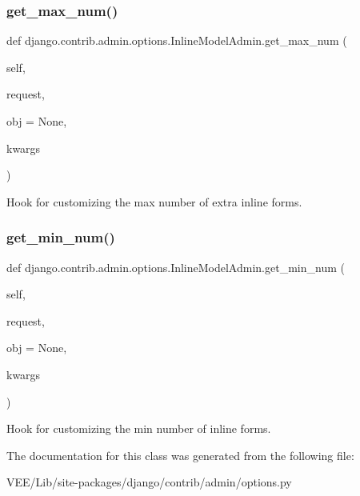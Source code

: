 \subsubsection{\texorpdfstring{get\+\_\+max\+\_\+num()}{get\_max\_num()}}
{\footnotesize\ttfamily def django.\+contrib.\+admin.\+options.\+Inline\+Model\+Admin.\+get\+\_\+max\+\_\+num (\begin{DoxyParamCaption}\item[{}]{self,  }\item[{}]{request,  }\item[{}]{obj = {\ttfamily None},  }\item[{}]{kwargs }\end{DoxyParamCaption})}

\begin{DoxyVerb}Hook for customizing the max number of extra inline forms.\end{DoxyVerb}
 \mbox{\label{classdjango_1_1contrib_1_1admin_1_1options_1_1_inline_model_admin_aa3ce6a713600c763a03ea706ebb0b01f}} 
\subsubsection{\texorpdfstring{get\+\_\+min\+\_\+num()}{get\_min\_num()}}
{\footnotesize\ttfamily def django.\+contrib.\+admin.\+options.\+Inline\+Model\+Admin.\+get\+\_\+min\+\_\+num (\begin{DoxyParamCaption}\item[{}]{self,  }\item[{}]{request,  }\item[{}]{obj = {\ttfamily None},  }\item[{}]{kwargs }\end{DoxyParamCaption})}

\begin{DoxyVerb}Hook for customizing the min number of inline forms.\end{DoxyVerb}
 

The documentation for this class was generated from the following file\+:\begin{DoxyCompactItemize}
\item 
V\+E\+E/\+Lib/site-\/packages/django/contrib/admin/options.\+py\end{DoxyCompactItemize}
